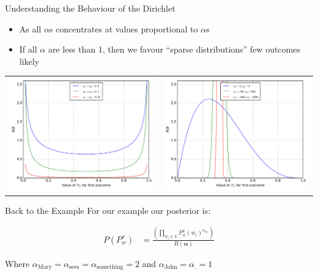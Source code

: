 \documentclass[11pt]{beamer}
\begin{document}
	\begin{frame}{Understanding the Behaviour of the Dirichlet}
		\begin{itemize}
			\item As all $\alpha$s concentrates at values proportional to $\alpha$s
			\item If all $\alpha$ are less than 1, then we favour ``sparse distributions'' few outcomes likely
		\end{itemize}
		
		\begin{tabular}{lr}
			\includegraphics[width=0.49\linewidth]{dirichlet_distribution_sparse_pdf} &
			\includegraphics[width=0.49\linewidth]{dirichlet_distribution_dense_pdf} \\
		\end{tabular}
	\end{frame}
		
	\begin{frame}{Back to the Example}
		For our example our posterior is:

		\vspace{10pt}		
		\begin{align*}
			P(P_{w}^x) & = \frac{\left(\prod_{w_i \in L} P_{w}^{x}(w_i)^{\alpha_{w_i}}\right)}{B(\boldsymbol{\alpha})}
		\end{align*}
		
		\vspace{10pt} Where $\alpha_{\text{Mary}}=\alpha_{\text{sees}} = \alpha_{\text{something}} = 2$ and $\alpha_{\text{John}}=\alpha_{\text{.}}=1$
	\end{frame}
	
\end{document}

